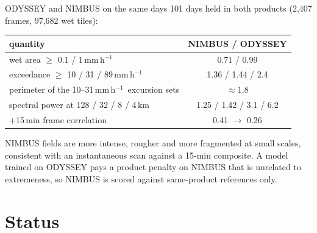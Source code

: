 \documentclass[aspectratio=169,10pt]{beamer}
\newcommand{\mmh}{\,mm\,h$^{-1}$}
\begin{document}
\begin{frame}{ODYSSEY and NIMBUS on the same days}
  \small
  101 days held in both products (2,407 frames, 97,682 wet tiles):
  \vspace{2mm}

  \centering
  \begin{tabular}{lc}
    \toprule
    quantity & NIMBUS / ODYSSEY \\
    \midrule
    wet area $\ge$ 0.1 / 1\mmh & 0.71 / 0.99 \\
    exceedance $\ge$ 10 / 31 / 89\mmh & 1.36 / 1.44 / 2.4 \\
    perimeter of the 10--31\mmh\ excursion sets & $\approx$1.8 \\
    spectral power at 128 / 32 / 8 / 4\,km & 1.25 / 1.42 / 3.1 / 6.2 \\
    +15\,min frame correlation & 0.41 $\to$ 0.26 \\
    \bottomrule
  \end{tabular}
  \vspace{2mm}

  \raggedright
  NIMBUS fields are more intense, rougher and more fragmented at small scales, consistent with
  an instantaneous scan against a 15-min composite. A model trained on ODYSSEY pays a product
  penalty on NIMBUS that is unrelated to extremeness, so NIMBUS is scored against
  same-product references only.
\end{frame}

\section{Status}
\end{document}
